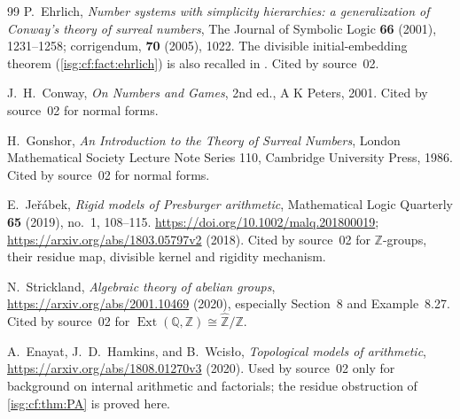 \documentclass[11pt]{article}
\theoremstyle{definition}
\theoremstyle{remark}
\newcommand{\Z}{\mathbb{Z}}
\newcommand{\Q}{\mathbb{Q}}
\newcommand{\Zhat}{\widehat{\Z}}
\newcommand{\Ext}{\operatorname{Ext}}
\begin{document}
\begin{thebibliography}{99}
P.~Ehrlich, \emph{Number systems with simplicity hierarchies:
a generalization of Conway's theory of surreal numbers},
The Journal of Symbolic Logic \textbf{66} (2001), 1231--1258;
corrigendum, \textbf{70} (2005), 1022.
The divisible initial-embedding theorem (\cref{isg:cf:fact:ehrlich}) is
also recalled in \cite{EK}. Cited by source~02.

J.~H.~Conway, \emph{On Numbers and Games}, 2nd ed., A K Peters, 2001.
Cited by source~02 for normal forms.

H.~Gonshor, \emph{An Introduction to the Theory of Surreal Numbers},
London Mathematical Society Lecture Note Series 110,
Cambridge University Press, 1986. Cited by source~02 for normal forms.

E.~Je\v r\'abek, \emph{Rigid models of Presburger arithmetic},
Mathematical Logic Quarterly \textbf{65} (2019), no.~1, 108--115.
\url{https://doi.org/10.1002/malq.201800019};
\url{https://arxiv.org/abs/1803.05797v2} (2018).
Cited by source~02 for $\Z$-groups, their residue map, divisible kernel
and rigidity mechanism.

N.~Strickland, \emph{Algebraic theory of abelian groups},
\url{https://arxiv.org/abs/2001.10469} (2020),
especially Section~8 and Example~8.27. Cited by source~02 for
$\Ext(\Q,\Z)\cong\Zhat/\Z$.

A.~Enayat, J.~D.~Hamkins, and B.~Wcis\l o,
\emph{Topological models of arithmetic},
\url{https://arxiv.org/abs/1808.01270v3} (2020).
Used by source~02 only for background on internal arithmetic and
factorials; the residue obstruction of \cref{isg:cf:thm:PA} is proved
here.
\end{thebibliography}
\end{document}
